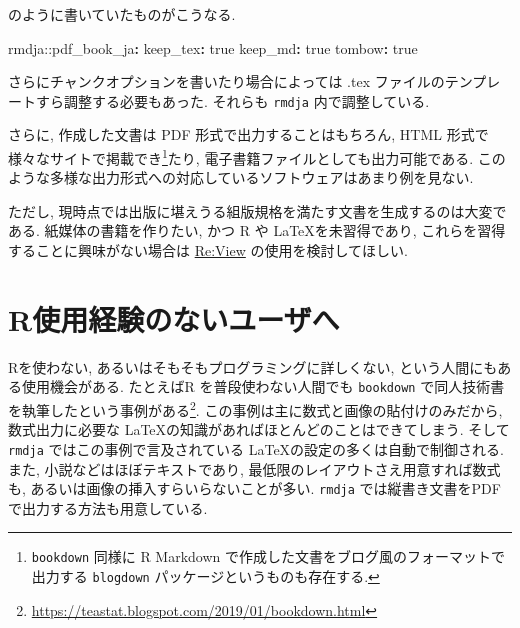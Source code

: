 \documentclass[
]{bxjsbook}
\newenvironment{Shaded}{\begin{snugshade}}{\end{snugshade}}
\newcommand{\AttributeTok}[1]{\textcolor[rgb]{0.77,0.63,0.00}{#1}}
\newcommand{\CharTok}[1]{\textcolor[rgb]{0.31,0.60,0.02}{#1}}
\newcommand{\FunctionTok}[1]{\textcolor[rgb]{0.00,0.00,0.00}{#1}}
\newcommand{\KeywordTok}[1]{\textcolor[rgb]{0.13,0.29,0.53}{\textbf{#1}}}
\newenvironment{infobox}[1]{\begin{itemize}\renewcommand{\labelitemi}{\raisebox{-.7\height}[0pt][0pt]{%
  {\setkeys{Gin}{width=3em,keepaspectratio}\texttt{[image: \_latex/\_img/\#1]}}}}
  \setlength{\fboxsep}{1em}
  \begin{greyblock}
  \item
  }{\end{greyblock}\end{itemize}
}
\newenvironment{warning}{\begin{infobox}{warning}}{\end{infobox}}
\theoremstyle{definition}
\theoremstyle{definition}
\theoremstyle{definition}
\theoremstyle{remark}
\begin{document}
のように書いていたものがこうなる.

\begin{Shaded}
\begin{Highlighting}[]
\AttributeTok{rmdja:}\FunctionTok{:pdf\_book\_ja}\KeywordTok{:}
\AttributeTok{  }\FunctionTok{keep\_tex}\KeywordTok{:}\AttributeTok{ }\CharTok{true}
\AttributeTok{  }\FunctionTok{keep\_md}\KeywordTok{:}\AttributeTok{ }\CharTok{true}
\AttributeTok{  }\FunctionTok{tombow}\KeywordTok{:}\AttributeTok{ }\CharTok{true}
\end{Highlighting}
\end{Shaded}

さらにチャンクオプションを書いたり場合によっては .tex
ファイルのテンプレートすら調整する必要もあった. それらも \texttt{rmdja}
内で調整している.

さらに, 作成した文書は PDF 形式で出力することはもちろん, HTML
形式で様々なサイトで掲載でき\footnote{\texttt{bookdown} 同様に R
  Markdown で作成した文書をブログ風のフォーマットで出力する
  \texttt{blogdown} パッケージというものも存在する.}たり,
電子書籍ファイルとしても出力可能である.
このような多様な出力形式への対応しているソフトウェアはあまり例を見ない.

\begin{warning}
ただし,
現時点では出版に堪えうる組版規格を満たす文書を生成するのは大変である.
紙媒体の書籍を作りたい, かつ R や \LaTeX を未習得であり,
これらを習得することに興味がない場合は
\href{https://reviewml.org/ja/}{Re:View} の使用を検討してほしい.
\end{warning}

\hypertarget{rux4f7fux7528ux7d4cux9a13ux306eux306aux3044ux30e6ux30fcux30b6ux3078}{%
\section*{R使用経験のないユーザへ}\label{rux4f7fux7528ux7d4cux9a13ux306eux306aux3044ux30e6ux30fcux30b6ux3078}}

Rを使わない, あるいはそもそもプログラミングに詳しくない,
という人間にもある使用機会がある. たとえばR を普段使わない人間でも
\texttt{bookdown} で同人技術書を執筆したという事例がある\footnote{\url{https://teastat.blogspot.com/2019/01/bookdown.html}}.
この事例は主に数式と画像の貼付けのみだから, 数式出力に必要な
\LaTeX の知識があればほとんどのことはできてしまう. そして \texttt{rmdja}
ではこの事例で言及されている \LaTeX の設定の多くは自動で制御される.
また, 小説などはほぼテキストであり,
最低限のレイアウトさえ用意すれば数式も,
あるいは画像の挿入すらいらないことが多い. \texttt{rmdja}
では縦書き文書をPDFで出力する方法も用意している.
\end{document}
